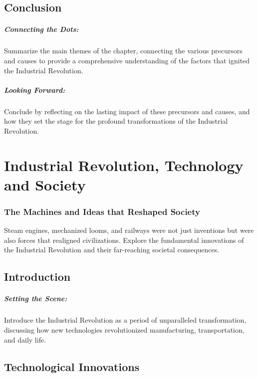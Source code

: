 \documentclass[a4paper,12pt]{book}
\begin{document}
\section*{Conclusion}

\paragraph{Connecting the Dots:}
Summarize the main themes of the chapter, connecting the various precursors and causes to provide a comprehensive understanding of the factors that ignited the Industrial Revolution.

\paragraph{Looking Forward:}
Conclude by reflecting on the lasting impact of these precursors and causes, and how they set the stage for the profound transformations of the Industrial Revolution.

\chapter{Industrial Revolution, Technology and Society}
\subsection*{The Machines and Ideas that Reshaped Society}
Steam engines, mechanized looms, and railways were not just inventions but were also forces that realigned civilizations. Explore the fundamental innovations of the Industrial Revolution and their far-reaching societal consequences.

\section*{Introduction}

\paragraph{Setting the Scene:}
Introduce the Industrial Revolution as a period of unparalleled transformation, discussing how new technologies revolutionized manufacturing, transportation, and daily life.

\section*{Technological Innovations}
\end{document}
